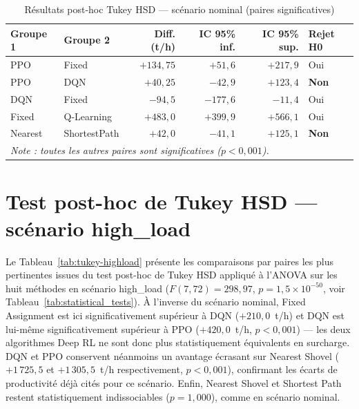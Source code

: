 \documentclass[11pt,a4paper]{report}
\begin{document}
\begin{table}[H]
\centering
\caption{Résultats post-hoc Tukey HSD — scénario nominal (paires significatives)}
\label{tab:tukey-nominal}
\small
\begin{tabular}{llrrrl}
\toprule
\textbf{Groupe 1} & \textbf{Groupe 2} & \textbf{Diff. (t/h)} & \textbf{IC 95\% inf.} & \textbf{IC 95\% sup.} & \textbf{Rejet H0} \\
\midrule
PPO   & Fixed      & $+134{,}75$ & $+51{,}6$  & $+217{,}9$ & Oui \\
PPO   & DQN        & $+40{,}25$  & $-42{,}9$  & $+123{,}4$ & \textbf{Non} \\
DQN   & Fixed      & $-94{,}5$   & $-177{,}6$ & $-11{,}4$  & Oui \\
Fixed & Q-Learning & $+483{,}0$  & $+399{,}9$ & $+566{,}1$ & Oui \\
Nearest & ShortestPath & $+42{,}0$ & $-41{,}1$ & $+125{,}1$ & \textbf{Non} \\
\midrule
\multicolumn{6}{l}{\textit{Note : toutes les autres paires sont significatives ($p < 0{,}001$).}} \\
\bottomrule
\end{tabular}
\end{table}

\section*{Test post-hoc de Tukey HSD — scénario high\_load}

Le Tableau~\ref{tab:tukey-highload} présente les comparaisons par paires
les plus pertinentes issues du test post-hoc de Tukey HSD appliqué à
l'ANOVA sur les huit méthodes en scénario high\_load
($F(7,72) = 298{,}97$, $p = 1{,}5 \times 10^{-50}$, voir Tableau~\ref{tab:statistical_tests}).
À l'inverse du scénario nominal, Fixed Assignment est ici
significativement supérieur à DQN ($+210{,}0$~t/h) et DQN est lui-même
significativement supérieur à PPO ($+420{,}0$~t/h, $p < 0{,}001$) --- les
deux algorithmes Deep RL ne sont donc plus statistiquement équivalents
en surcharge. DQN et PPO conservent néanmoins un avantage écrasant sur
Nearest Shovel ($+1\,725{,}5$ et $+1\,305{,}5$~t/h respectivement,
$p < 0{,}001$), confirmant les écarts de productivité déjà cités pour
ce scénario. Enfin, Nearest Shovel et Shortest Path restent
statistiquement indissociables ($p = 1{,}000$), comme en scénario
nominal.
\end{document}
